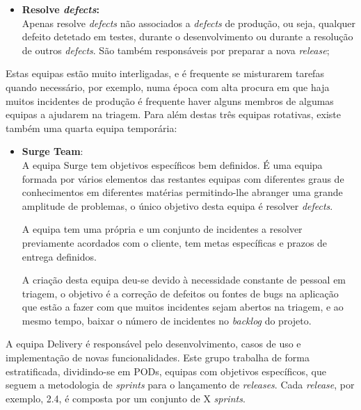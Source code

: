 \begin{itemize}
\begin{itemize}
                        \item \textbf{Resolve \textit{defects}:} \\
                        Apenas resolve \textit{defects} não associados a \textit{defects} de produção, ou seja, qualquer defeito detetado em testes, durante o desenvolvimento ou durante a resolução de outros \textit{defects}. São também responsáveis por preparar a nova \textit{release};
                    \end{itemize}

                    Estas equipas estão muito interligadas, e é frequente se misturarem tarefas quando necessário, por exemplo, numa época com alta procura em que haja muitos incidentes de produção é frequente haver alguns membros de algumas equipas a ajudarem na triagem.
                    Para além destas três equipas rotativas, existe também uma quarta equipa temporária:
                    \begin{itemize}
                        \item \textbf{Surge Team}: \\
                            A equipa Surge tem objetivos específicos bem definidos. É uma equipa formada por vários elementos das restantes equipas com diferentes graus de conhecimentos em diferentes matérias permitindo-lhe abranger uma grande amplitude de problemas, o único objetivo desta equipa é resolver \textit{defects}. 
                            
                            A equipa tem uma  própria e um conjunto de incidentes a resolver previamente acordados com o cliente, tem metas específicas e prazos de entrega definidos. 

                            A criação desta equipa deu-se devido à necessidade constante de pessoal em triagem, o objetivo é a correção de defeitos ou fontes de bugs na aplicação que estão a fazer com que muitos incidentes sejam abertos na triagem, e ao mesmo tempo, baixar o número de incidentes no \textit{backlog} do projeto.

                    \end{itemize}
                \end{itemize}

                
            
                A equipa Delivery é responsável pelo desenvolvimento, casos de uso e implementação de novas funcionalidades. Este grupo trabalha de forma estratificada, dividindo-se em PODs, equipas com objetivos específicos, que seguem a metodologia de \textit{sprints} para o lançamento de \textit{releases}. Cada \textit{release}, por exemplo, 2.4, é composta por um conjunto de X \textit{sprints}.
                
